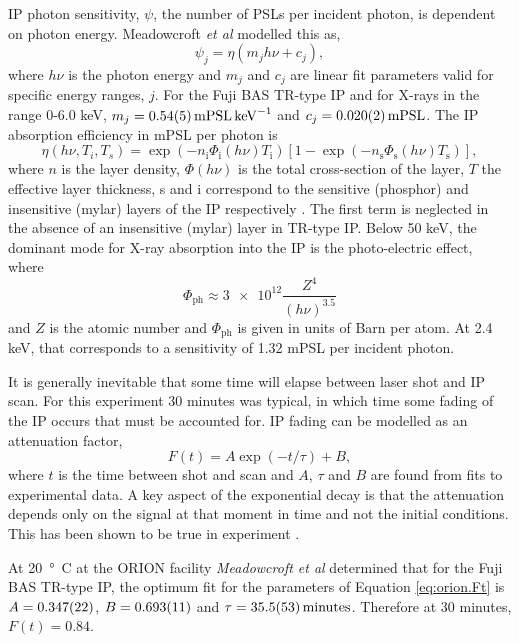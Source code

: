 IP photon sensitivity, $\psi$, the number of PSLs per incident photon, is dependent on photon energy. Meadowcroft \textit{et al} modelled this as,
\begin{equation}
	\psi_j = \eta(m_jh\nu + c_j),
\end{equation}
where $h\nu$ is the photon energy and $m_j$ and $c_j$ are linear fit parameters valid for specific energy ranges, $j$. For the Fuji BAS TR-type IP and for X-rays in the range 0-6.0 keV, $m_j = \qty{0.54\pm0.05}{mPSL.keV^{-1}}$ and $c_j = \qty{0.02\pm0.002}{mPSL}$. The IP absorption efficiency in mPSL per photon is
\begin{equation}
	\eta(h\nu,T_i,T_s) = \exp{(-n_\mathrm{i}\Phi_\mathrm{i} (h\nu)T_\mathrm{i})}[1-\exp{(-n_\mathrm{s}\Phi_\mathrm{s}(h\nu)T_\mathrm{s})}],
\end{equation}
where $n$ is the layer density, $\Phi(h\nu)$ is the total cross-section of the layer, $T$ the effective layer thickness, s and i correspond to the sensitive (phosphor) and insensitive (mylar) layers of the IP respectively \cite{izumiApplicationImagingPlates2006}. The first term is neglected in the absence of an insensitive (mylar) layer in TR-type IP. Below 50 keV, the dominant mode for X-ray absorption into the IP is the photo-electric effect, where
\begin{equation}
	\Phi_\mathrm{ph} \approx \num{3e12}\frac{Z^4}{(h\nu)^{3.5}}   
\end{equation}
and $Z$ is the atomic number \cite{fornalskiSimpleEmpiricalCorrection2018} and $\Phi_\mathrm{ph}$ is given in units of Barn per atom. At 2.4 keV, that corresponds to a sensitivity of 1.32 mPSL per incident photon.

It is generally inevitable that some time will elapse between laser shot and IP scan. For this experiment 30 minutes was typical, in which time some fading of the IP occurs that must be accounted for. IP fading can be modelled as an attenuation factor,
\begin{equation}\label{eq:orion.Ft}
	F(t) = A\exp{(-t/\tau)} + B,
\end{equation}
where $t$ is the time between shot and scan and $A$, $\tau$ and $B$ are found from fits to experimental data. A key aspect of the exponential decay is that the attenuation depends only on the signal at that moment in time and not the initial conditions. This has been shown to be true in experiment \cite{meadowcroftEvaluationSensitivityFading2008}.

At \qty{20}{\degree C} at the ORION facility \textit{Meadowcroft et al} \cite{meadowcroftEvaluationSensitivityFading2008} determined that for the Fuji BAS TR-type IP, the optimum fit for the parameters of Equation \ref{eq:orion.Ft} is $A = \num{0.347\pm0.022}$, $B = \num{0.693\pm0.011}$ and $\tau = \qty{35.5\pm5.3}{minutes}$. Therefore at 30 minutes, $F(t) = 0.84$.

